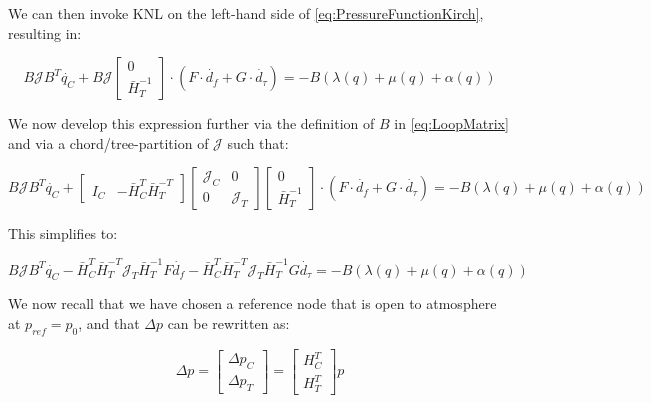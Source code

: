We can then invoke KNL on the left-hand side of \cref{eq:PressureFunctionKirch}, resulting in:

\begin{equation}\label{eq:PressureFunctionKirchKNL}
	B\mathcal{J}B^T\dot{q_C} + B \mathcal{J} 
	\begin{bmatrix} 0 \\ \bar{H}_T^{-1} \end{bmatrix} \cdot (F \cdot \dot{d_f} + G \cdot \dot{d_{\tau}})
	= -B(\lambda(q) + \mu(q) + \alpha(q))
\end{equation}

We now develop this expression further via the definition of $B$ in \cref{eq:LoopMatrix} and via a chord/tree-partition of $\mathcal{J}$ such that:

\begin{equation}\label{eq:PressureFunctionKirchJPartitions}
	B\mathcal{J}B^T\dot{q_C} + 
	\begin{bmatrix}		I_C & -\bar{H}_C^T\bar{H}_T^{-T}	\end{bmatrix} 
	\begin{bmatrix}		\mathcal{J}_C & 0 \\ 0 & \mathcal{J}_T	\end{bmatrix} 
	\begin{bmatrix} 0 \\ \bar{H}_T^{-1} \end{bmatrix} \cdot (F \cdot \dot{d_f} + G \cdot \dot{d_{\tau}})
	= -B(\lambda(q) + \mu(q) + \alpha(q))
\end{equation}

This simplifies to:

\begin{equation}\label{eq:PressureFunctionKirchJPartitionsSimp} %
	B\mathcal{J}B^T\dot{q_C} 
	-\bar{H}_C^T\bar{H}_T^{-T}\mathcal{J}_T\bar{H}_T^{-1} F \dot{d_f} 
	-\bar{H}_C^T\bar{H}_T^{-T}\mathcal{J}_T\bar{H}_T^{-1} G \dot{d_{\tau}}
	= -B(\lambda(q) + \mu(q) + \alpha(q))
\end{equation}

We now recall that we have chosen a reference node that is open to atmosphere at $p_{ref} = p_0$, and that $\Delta p$ can be rewritten as: 

\begin{equation}\label{eq:DeltaPPartition}
	\Delta p =
	\begin{bmatrix}		\Delta p_C \\ \Delta p_T	\end{bmatrix} = 
	\begin{bmatrix}		H_C^T \\ H_T^T	\end{bmatrix} p
\end{equation}

